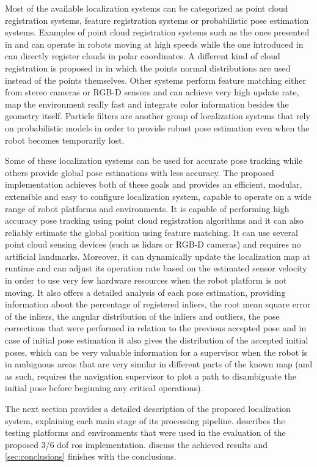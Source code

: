 Most of the available localization systems can be categorized as point cloud registration systems, feature registration systems or probabilistic pose estimation systems. Examples of point cloud registration systems such as the ones presented in \cite{Lingemann2005} and \cite{Pomerleau2013} can operate in robots moving at high speeds while the one introduced in \cite{Diosi2005} can directly register clouds in polar coordinates. A different kind of cloud registration is proposed in \cite{Magnusson2009} in which the points normal distributions are used instead of the points themselves. Other systems perform feature matching either from stereo cameras \cite{Kitt2010} or RGB-D sensors \cite{Whelan2013a} and can achieve very high update rate, map the environment really fast and integrate color information besides the geometry itself. Particle filters \cite{Thrun2002} are another group of localization systems that rely on probabilistic models in order to provide robust pose estimation even when the robot becomes temporarily lost.

Some of these localization systems can be used for accurate pose tracking while others provide global pose estimations with less accuracy. The proposed implementation achieves both of these goals and provides an efficient, modular, extensible and easy to configure localization system, capable to operate on a wide range of robot platforms and environments. It is capable of performing high accuracy pose tracking using point cloud registration algorithms and it can also reliably estimate the global position using feature matching. It can use several point cloud sensing devices (such as \glspl{lidar} or RGB-D cameras) and requires no artificial landmarks. Moreover, it can dynamically update the localization map at runtime and can adjust its operation rate based on the estimated sensor velocity in order to use very few hardware resources when the robot platform is not moving. It also offers a detailed analysis of each pose estimation, providing information about the percentage of registered inliers, the root mean square error of the inliers, the angular distribution of the inliers and outliers, the pose corrections that were performed in relation to the previous accepted pose and in case of initial pose estimation it also gives the distribution of the accepted initial poses, which can be very valuable information for a supervisor when the robot is in ambiguous areas that are very similar in different parts of the known map (and as such, requires the navigation supervisor to plot a path to disambiguate the initial pose before beginning any critical operations).

The next section provides a detailed description of the proposed localization system, explaining each main stage of its processing pipeline.  describes the testing platforms and environments that were used in the evaluation of the proposed 3/6 \gls{dof} \gls{ros} implementation.  discuss the achieved results and \cref{sec:conclusions} finishes with the conclusions.
